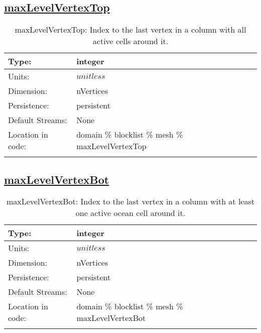 \subsection[maxLevelVertexTop]{\hyperref[sec:var_tab_mesh]{maxLevelVertexTop}}
\label{subsec:var_sec_mesh_maxLevelVertexTop}
\begin{center}
\begin{longtable}{| p{2.0in} | p{4.0in} |}
        \hline 
        Type: & integer \\
        \hline 
        Units: & $unitless$ \\
        \hline 
        Dimension: & nVertices \\
        \hline 
        Persistence: & persistent \\
        \hline 
		 Default Streams: & None \\
        \hline 
		 Location in code: & domain \% blocklist \% mesh \% maxLevelVertexTop \\
		 \hline 
    \caption{maxLevelVertexTop: Index to the last vertex in a column with all active cells around it.}
\end{longtable}
\end{center}
\subsection[maxLevelVertexBot]{\hyperref[sec:var_tab_mesh]{maxLevelVertexBot}}
\label{subsec:var_sec_mesh_maxLevelVertexBot}
\begin{center}
\begin{longtable}{| p{2.0in} | p{4.0in} |}
        \hline 
        Type: & integer \\
        \hline 
        Units: & $unitless$ \\
        \hline 
        Dimension: & nVertices \\
        \hline 
        Persistence: & persistent \\
        \hline 
		 Default Streams: & None \\
        \hline 
		 Location in code: & domain \% blocklist \% mesh \% maxLevelVertexBot \\
		 \hline 
    \caption{maxLevelVertexBot: Index to the last vertex in a column with at least one active ocean cell around it.}
\end{longtable}
\end{center}
